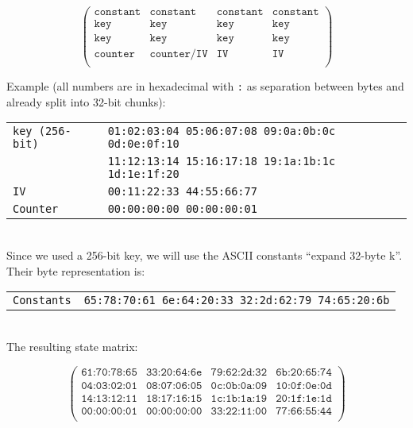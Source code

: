 \begin{equation*}
\begin{pmatrix}
\texttt{constant}& \texttt{constant} & \texttt{constant} & \texttt{constant} \\
\texttt{key} & \texttt{key} & \texttt{key} & \texttt{key} \\
\texttt{key} & \texttt{key} & \texttt{key} & \texttt{key} \\
\texttt{counter} & \texttt{counter/IV} & \texttt{IV} & \texttt{IV} \\
\end{pmatrix}
\end{equation*}

Example (all numbers are in hexadecimal with \texttt{:} as separation between bytes and already split into 32-bit chunks):\\

\begin{tabular}{ l l }
 \texttt{key (256-bit)} & \texttt{01:02:03:04 05:06:07:08 09:0a:0b:0c 0d:0e:0f:10} \\ 
 & \texttt{11:12:13:14 15:16:17:18 19:1a:1b:1c 1d:1e:1f:20}\\
 \texttt{IV} & \texttt{00:11:22:33 44:55:66:77} \\  
\texttt{Counter} & \texttt{00:00:00:00 00:00:00:01} \\
\end{tabular}
\\

\noindent Since we used a 256-bit key, we will use the ASCII constants ``expand 32-byte k''. Their byte representation is:\\

\begin{tabular}{ l l }
\texttt{Constants\phantom{MMMM}} & \texttt{65:78:70:61 6e:64:20:33 32:2d:62:79 74:65:20:6b} \\
\end{tabular}
\\

\noindent The resulting state matrix:

\begin{equation*}
\begin{pmatrix}
\texttt{61:70:78:65}& \texttt{33:20:64:6e} & \texttt{79:62:2d:32} & \texttt{6b:20:65:74} \\
\texttt{04:03:02:01} & \texttt{08:07:06:05} & \texttt{0c:0b:0a:09} & \texttt{10:0f:0e:0d} \\
\texttt{14:13:12:11} & \texttt{18:17:16:15} & \texttt{1c:1b:1a:19} & \texttt{20:1f:1e:1d} \\
\texttt{00:00:00:01} & \texttt{00:00:00:00} & \texttt{33:22:11:00} & \texttt{77:66:55:44} \\
\end{pmatrix}
\end{equation*}


